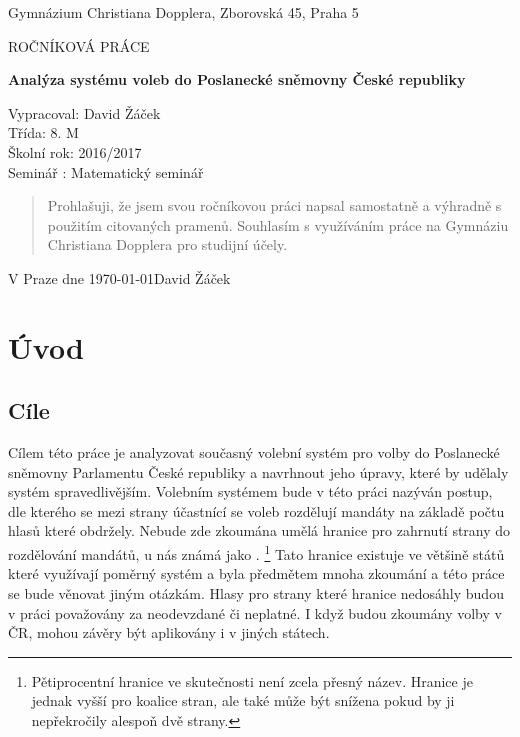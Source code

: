 \documentclass[12pt]{report}
\begin{document}
\begin{titlepage}
	\begin{center}
	{\large Gymnázium Christiana Dopplera, Zborovská 45, Praha 5 \par}
	\vfill
	\par\vspace{1cm}
	{\scshape\LARGE ROČNÍKOVÁ PRÁCE \par}
	{\huge\bfseries Analýza systému voleb do Poslanecké sněmovny České republiky\par}
	\vfill
\end{center}
	\vfill
Vypracoval: David Žáček \\
Třída: 8. M \\
Školní rok: 2016/2017 \\
Seminář : Matematický seminář \\

\end{titlepage}

\vspace*{\fill}
\begin{quote}
Prohlašuji, že jsem svou ročníkovou práci napsal samostatně a výhradně s
použitím 
citovaných pramenů. Souhlasím s
využíváním 
práce na Gymnáziu Christiana Dopplera 
pro studijní účely. \\
\end{quote}

V Praze dne \today \hfill David Žáček

\vspace*{\fill}
\thispagestyle{empty}
\newpage
\tableofcontents
\newpage
\chapter{Úvod}
\section{Cíle} Cílem této práce je analyzovat současný volební systém pro volby do Poslanecké sněmovny Parlamentu České republiky a navrhnout jeho úpravy, které by udělaly systém spravedlivějším.
Volebním systémem bude v této práci nazýván postup, dle kterého se mezi strany účastnící se voleb rozdělují mandáty na základě počtu hlasů které obdržely.
Nebude zde zkoumána umělá hranice pro zahrnutí strany do rozdělování mandátů, u nás známá jako .
\footnote{Pětiprocentní hranice ve skutečnosti není zcela přesný název.
Hranice je jednak vyšší pro koalice stran, ale také může být snížena pokud by ji nepřekročily alespoň dvě strany.\autocite{ZAK}} Tato hranice existuje ve většině států které využívají poměrný systém a byla předmětem mnoha zkoumání a této práce se bude věnovat jiným otázkám.
Hlasy pro strany které hranice nedosáhly budou v práci považovány za neodevzdané či neplatné.
I když budou zkoumány volby v ČR, mohou závěry být aplikovány i v jiných státech.
\end{document}
